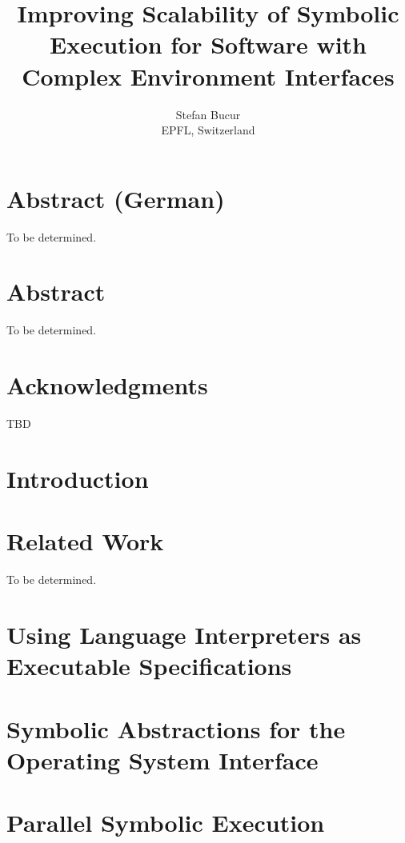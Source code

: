 \documentclass[letterpaper,10pt,oneside]{book}
\newcommand{\thesistitle}{Improving Scalability of Symbolic Execution for Software with Complex Environment Interfaces}
\begin{document}
\date{}
\title{\thesistitle}
\author{Stefan Bucur \\ EPFL, Switzerland}

\maketitle

\chapter*{Abstract (German)}

To be determined.

\chapter*{Abstract}

To be determined.

\chapter*{Acknowledgments}

TBD

\tableofcontents
\listoffigures
\listoftables

\chapter{Introduction}
\label{ch:introduction}



\chapter{Related Work}
\label{ch:relatedwork}

To be determined.


\chapter{Using Language Interpreters as Executable Specifications}
\label{ch:chef}



\chapter{Symbolic Abstractions for the Operating System Interface}
\label{ch:cloud9}



\chapter{Parallel Symbolic Execution}
\label{ch:parsymbex}

\end{document}

